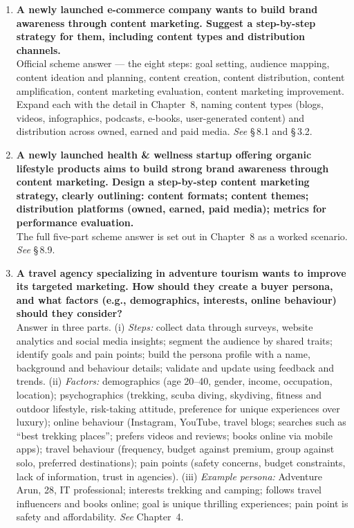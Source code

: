 \documentclass{MMTextbook}
\begin{document}
\begin{enumerate}[leftmargin=2.2em,itemsep=1.4ex]

\item \textbf{A newly launched e-commerce company wants to build brand awareness
      through content marketing. Suggest a step-by-step strategy for them,
      including content types and distribution channels.}
      \\
      Official scheme answer --- the eight steps: goal setting, audience
      mapping, content ideation and planning, content creation, content
      distribution, content amplification, content marketing evaluation, content
      marketing improvement. Expand each with the detail in Chapter~8, naming
      content types (blogs, videos, infographics, podcasts, e-books,
      user-generated content) and distribution across owned, earned and paid
      media. \hfill\emph{See} \S\,8.1 and \S\,3.2.

\item \textbf{A newly launched health \& wellness startup offering organic
      lifestyle products aims to build strong brand awareness through content
      marketing. Design a step-by-step content marketing strategy, clearly
      outlining: content formats; content themes; distribution platforms (owned,
      earned, paid media); metrics for performance evaluation.}
      \\
      The full five-part scheme answer is set out in Chapter~8 as a worked
      scenario. \hfill\emph{See} \S\,8.9.

\item \textbf{A travel agency specializing in adventure tourism wants to improve
      its targeted marketing. How should they create a buyer persona, and what
      factors (e.g., demographics, interests, online behaviour) should they
      consider?}
      \\
      Answer in three parts. (i) \emph{Steps:} collect data through surveys,
      website analytics and social media insights; segment the audience by
      shared traits; identify goals and pain points; build the persona profile
      with a name, background and behaviour details; validate and update using
      feedback and trends. (ii) \emph{Factors:} demographics (age 20--40,
      gender, income, occupation, location); psychographics (trekking, scuba
      diving, skydiving, fitness and outdoor lifestyle, risk-taking attitude,
      preference for unique experiences over luxury); online behaviour
      (Instagram, YouTube, travel blogs; searches such as ``best trekking
      places''; prefers videos and reviews; books online via mobile apps);
      travel behaviour (frequency, budget against premium, group against solo,
      preferred destinations); pain points (safety concerns, budget constraints,
      lack of information, trust in agencies). (iii) \emph{Example persona:}
      Adventure Arun, 28, IT professional; interests trekking and camping;
      follows travel influencers and books online; goal is unique thrilling
      experiences; pain point is safety and affordability.
      \hfill\emph{See} Chapter~4.


\end{enumerate}
\end{document}
